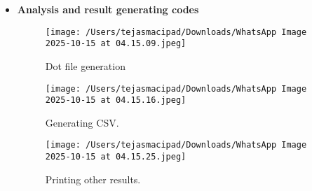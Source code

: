 \documentclass[12pt, a4paper]{report}
\begin{document}
\begin{itemize}
        \begin{itemize}
            \item \textbf{Reaching Definitions:}
            \begin{itemize}
                \item Each block is assigned a symbolic name like B0, B1 and so on.
                \item IN and OUT for each block contains the mapping, that will eventually hold which definitions reach that block before\/after.
                \item preds function finds which blocks are predecessor to each block.
                \item Runs an interation until convergence, that is it runs until there is a change capped to 100 iterations.
                \item Within each iteration, for every block we start with an empty set.
                \item For every predecessor block p, union together all definitions that can exit the block thus giving candidate definitions that could reach the entrance of this block.
                \item candidates that are reassighned during the iteration, are removed because of being overwritten.
                \item We also add the locally generated variables.
                \item Finally in\_new and out\_new are updated and in case there is no change in these for any of the blocks, we stop the iteration.
            \end{itemize}
        \end{itemize}

     \item \textbf{Analysis and result generating codes}
        \begin{figure}[h!]
            \centering
            \texttt{[image: /Users/tejasmacipad/Downloads/WhatsApp Image 2025-10-15 at 04.15.09.jpeg]}
            \caption{Dot file generation}
            \label{fig:diff-example-58}
        \end{figure}

        \begin{figure}[h!]
            \centering
            \texttt{[image: /Users/tejasmacipad/Downloads/WhatsApp Image 2025-10-15 at 04.15.16.jpeg]}
            \caption{Generating CSV.}
            \label{fig:diff-example-59}
        \end{figure}

        \begin{figure}[h!]
            \centering
            \texttt{[image: /Users/tejasmacipad/Downloads/WhatsApp Image 2025-10-15 at 04.15.25.jpeg]}
            \caption{Printing other results.}
            \label{fig:diff-example-60}
        \end{figure}

\end{itemize}
\end{document}
